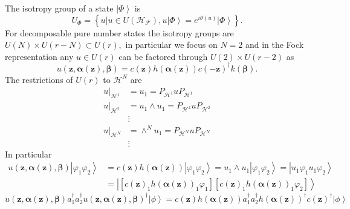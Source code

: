 \documentclass[aps,preprint]{revtex4}%
\begin{document}
The isotropy group of a state $\left\vert \Phi\right\rangle $ is
\begin{equation}
U_{\Phi}=\left\{  \left.  u\right\vert u\in U\left(  \mathcal{H}_{\mathcal{F}%
}\right)  ,u\left\vert \Phi\right\rangle =e^{i\theta\left(  u\right)
}\left\vert \Phi\right\rangle \right\}  .
\end{equation}
For decomposable pure number states the isotropy groups are $U\left(
N\right)  \times U\left(  r-N\right)  \subset U\left(  r\right)  ,$ in
particular we focus on $N=2$ and in the Fock representation any $u\in U\left(
r\right)  $ can be factored through $U\left(  2\right)  \times U\left(
r-2\right)  $ as
\begin{equation}
u\left(  \mathbf{z,\alpha\left(  \mathbf{z}\right)  ,\beta}\right)  =c\left(
\mathbf{z}\right)  h\left(  \mathbf{\alpha}\left(  \mathbf{z}\right)  \right)
c\left(  -\mathbf{z}\right)  ^{\dagger}k\left(  \mathbf{\beta}\right)  .
\end{equation}
The restrictions of $U\left(  r\right)  $ to $\mathcal{H}^{N}$ are
\begin{align}
\left.  u\right\vert _{\mathcal{H}^{1}}  &  =u_{1}=P_{\mathcal{H}^{1}%
}uP_{\mathcal{H}^{1}}\\
\left.  u\right\vert _{\mathcal{H}^{2}}  &  =u_{1}\wedge u_{1}=P_{\mathcal{H}%
^{2}}uP_{\mathcal{H}^{2}}\\
&  \vdots\\
\left.  u\right\vert _{\mathcal{H}^{N}}  &  =\wedge^{N}u_{1}=P_{\mathcal{H}%
^{N}}uP_{\mathcal{H}^{N}}\\
&  \vdots
\end{align}
In particular
\begin{align}
u\left(  \mathbf{z,\alpha\left(  \mathbf{z}\right)  ,\beta}\right)  \left\vert
\varphi_{1}\varphi_{2}\right\rangle  &  =c\left(  \mathbf{z}\right)  h\left(
\mathbf{\alpha}\left(  \mathbf{z}\right)  \right)  \left\vert \varphi
_{1}\varphi_{2}\right\rangle =u_{1}\wedge u_{1}\left\vert \varphi_{1}%
\varphi_{2}\right\rangle =\left\vert u_{1}\varphi_{1}u_{1}\varphi
_{2}\right\rangle \\
&  =\left\vert \left[  c\left(  \mathbf{z}\right)  _{1}h\left(  \mathbf{\alpha
}\left(  \mathbf{z}\right)  \right)  _{1}\varphi_{1}\right]  \left[  c\left(
\mathbf{z}\right)  _{1}h\left(  \mathbf{\alpha}\left(  \mathbf{z}\right)
\right)  _{1}\varphi_{2}\right]  \right\rangle
\end{align}%
\begin{equation}
u\left(  \mathbf{z,\alpha\left(  \mathbf{z}\right)  ,\beta}\right)
a_{1}^{\dagger}a_{2}^{\dagger}u\left(  \mathbf{z,\alpha\left(  \mathbf{z}%
\right)  ,\beta}\right)  ^{\dagger}\left\vert \phi\right\rangle =c\left(
\mathbf{z}\right)  h\left(  \mathbf{\alpha}\left(  \mathbf{z}\right)  \right)
a_{1}^{\dagger}a_{2}^{\dagger}h\left(  \mathbf{\alpha}\left(  \mathbf{z}%
\right)  \right)  ^{\dagger}c\left(  \mathbf{z}\right)  ^{\dagger}\left\vert
\phi\right\rangle
\end{equation}
\end{document}
